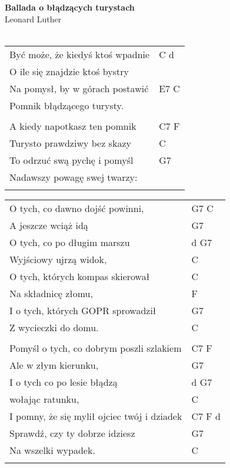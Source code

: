 \documentclass[a5paper]{article}
\begin{document}


\noindent
\fontsize{12pt}{15pt}\selectfont
\textbf{Ballada o błądzących turystach} \\
\fontsize{8pt}{10pt}\selectfont
Leonard Luther \\ \\
\fontsize{10pt}{12pt}\selectfont
{}
\begin{tabular}{@{}p{8.5cm}p{3cm}@{}}
\noindent
Być może, że kiedyś ktoś wpadnie & C d \\
O ile się znajdzie ktoś bystry \\
Na pomysł, by w górach postawić & E7 C \\
Pomnik błądzącego turysty. \\ \\

A kiedy napotkasz ten pomnik & C7 F \\
Turysto prawdziwy bez skazy & C \\
To odrzuć swą pychę i pomyśl & G7 \\
Nadawszy powagę swej twarzy: \\ \\
\end{tabular}

\noindent
\begin{tabular}{@{}p{7.5cm}p{3cm}@{}}
O tych, co dawno dojść powinni, & G7 C \\
A jeszcze wciąż idą & G7 \\
O tych, co po długim marszu & d G7 \\
Wyjściowy ujrzą widok, & C \\
O tych, których kompas skierował & C \\
Na składnicę złomu, & F \\
I o tych, których GOPR sprowadził & G7 \\
Z wycieczki do domu. & C \\ \\

Pomyśl o tych, co dobrym poszli szlakiem & C7 F \\
Ale w złym kierunku, & G7 \\
I o tych co po lesie błądzą & d G7 \\
wołając ratunku, & C \\
I pomny, że się mylił ojciec twój i dziadek & C7 F d \\
Sprawdź, czy ty dobrze idziesz & G7 \\
Na wszelki wypadek. & C \\\\
\end{tabular}
\end{document}
